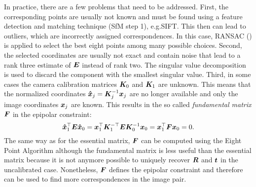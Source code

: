 			In practice, there are a few problems that need to be addressed.
			First, the corresponding points are usually not known and must be found using a feature detection and matching technique (SfM step 1), e.g.\@ SIFT.
			This then can lead to outliers, which are incorrectly assigned correspondences.
			In this case, {RANSAC} (\cite{fischler1981random}) is applied to select the best eight points among many possible choices.
			Second, the selected coordinates are usually not exact and contain noise that lead to a rank three estimate of $\bm{E}$ instead of rank two.
			The singular value decomposition is used to discard the component with the smallest singular value.
			Third, in some cases the camera calibration matrices $\bm{K}_0$ and $\bm{K}_1$ are unknown.
			This means that the normalized coordinates $\bm{\hat{x}}_j = \bm{K}_j^{-1} \bm{x}_j$ are no longer available and only the image coordinates $\bm{x}_j$ are known.
			This results in the so called \emph{fundamental matrix} $\bm{F}$ in the epipolar constraint:
			\begin{equation}\label{eq:fundamental_matrix_epipolar_constraint}
				\bm{\hat{x}}_1^\top \bm{E} \bm{\hat{x}}_0 = 
				\bm{x}_1^\top \bm{K}_1^{-\top} \bm{E} \bm{K}_0^{-1} \bm{x}_0 = 
				\bm{x}_1^\top \bm{F} \bm{x}_0 = 0.
			\end{equation}
			The same way as for the essential matrix, $\bm{F}$ can be computed using the Eight Point Algorithm although the fundamental matrix is less useful than the essential matrix because it is not anymore possible to uniquely recover $\bm{R}$ and $\bm{t}$ in the uncalibrated case.
			Nonetheless, $\bm{F}$ defines the epipolar constraint and therefore can be used to find more correspondences in the image pair.
			
			

			
